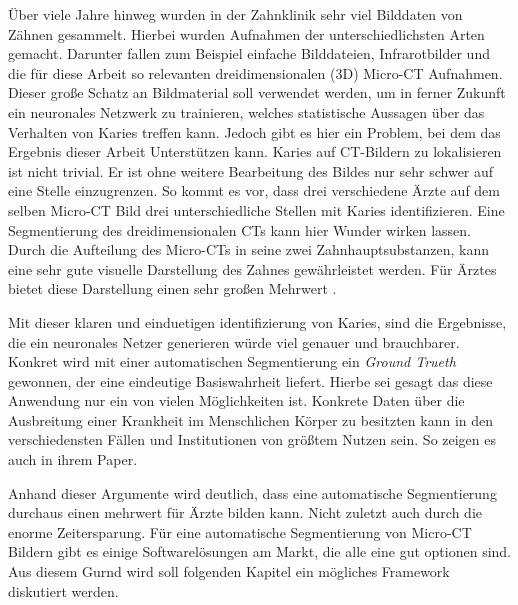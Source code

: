 Über viele Jahre hinweg wurden in der Zahnklinik sehr viel Bilddaten von Zähnen
gesammelt. Hierbei wurden Aufnahmen der unterschiedlichsten Arten gemacht.
Darunter fallen zum Beispiel einfache Bilddateien, Infrarotbilder und die für diese
Arbeit so relevanten dreidimensionalen (3D) Micro-CT Aufnahmen. Dieser große
Schatz an Bildmaterial soll verwendet werden, um in ferner Zukunft ein neuronales
Netzwerk zu trainieren, welches statistische Aussagen über das Verhalten von
Karies treffen kann. Jedoch gibt es hier ein Problem, bei dem das Ergebnis
dieser Arbeit Unterstützen kann. Karies auf CT-Bildern zu lokalisieren ist nicht
trivial. Er ist ohne weitere Bearbeitung des Bildes nur sehr schwer auf eine
Stelle einzugrenzen. So kommt es vor, dass drei verschiedene Ärzte auf dem
selben Micro-CT Bild drei unterschiedliche Stellen mit Karies identifizieren. Eine
Segmentierung des dreidimensionalen CTs kann hier Wunder wirken lassen. Durch
die Aufteilung des Micro-CTs in seine zwei Zahnhauptsubstanzen, kann eine sehr gute
visuelle Darstellung des Zahnes gewährleistet werden. Für Ärztes bietet diese
Darstellung einen sehr großen Mehrwert \citep[vgl.][S. 1]{walter2025projekt}.

Mit dieser klaren und einduetigen identifizierung von Karies, sind die
Ergebnisse, die ein neuronales Netzer generieren würde viel genauer und brauchbarer.
Konkret wird mit einer automatischen Segmentierung ein \textit{Ground Trueth} gewonnen,
der eine eindeutige Basiswahrheit liefert. Hierbe sei gesagt das diese Anwendung
nur ein von vielen Möglichkeiten ist. Konkrete Daten über die Ausbreitung einer
Krankheit im Menschlichen Körper zu besitzten kann in den verschiedensten Fällen
und Institutionen von größtem Nutzen sein. So zeigen es auch \citet{de20083d} in
ihrem Paper.

Anhand dieser Argumente wird deutlich, dass eine automatische Segmentierung durchaus
einen mehrwert für Ärzte bilden kann. Nicht zuletzt auch durch die enorme
Zeitersparung. Für eine automatische Segmentierung von Micro-CT Bildern gibt es einige
Softwarelösungen am Markt, die alle eine gut optionen sind. Aus diesem Gurnd wird
soll folgenden Kapitel ein mögliches Framework diskutiert werden.

